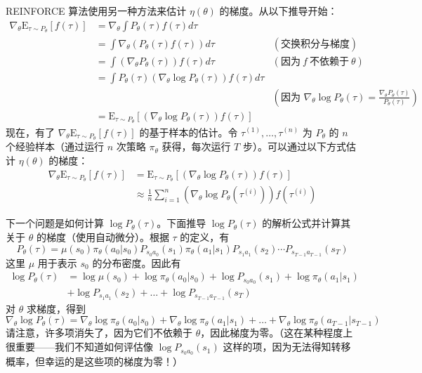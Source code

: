 REINFORCE 算法使用另一种方法来估计 $\eta(\theta)$ 的梯度。从以下推导开始：
\begin{align}
    \nabla_\theta \mathrm{E}_{\tau \sim P_\theta} [f(\tau)] &= \nabla_\theta \int P_\theta(\tau) f(\tau) d\tau &\nonumber \\
    &= \int \nabla_\theta (P_\theta(\tau) f(\tau)) d\tau &(\text{交换积分与梯度})& \nonumber \\
    &= \int (\nabla_\theta P_\theta(\tau)) f(\tau) d\tau &(\text{因为}\ f \ \text{不依赖于}\ \theta) &\nonumber \\
    &= \int P_\theta(\tau) (\nabla_\theta \log P_\theta(\tau)) f(\tau) d\tau \nonumber \\
    && (\text{因为 } \nabla_\theta \log P_\theta(\tau) = \frac{\nabla_\theta P_\theta(\tau)}{P_\theta(\tau)}) &\nonumber \\
    &= \mathrm{E}_{\tau \sim P_\theta} [(\nabla_\theta \log P_\theta(\tau)) f(\tau)] \label{eq:17.3}
\end{align}
现在，有了 $\nabla_\theta \mathrm{E}_{\tau \sim P_\theta} [f(\tau)]$ 的基于样本的估计。令 $\tau^{(1)}, \dots, \tau^{(n)}$ 为 $P_\theta$ 的 $n$ 个经验样本（通过运行 $n$ 次策略 $\pi_\theta$ 获得，每次运行 $T$ 步）。可以通过以下方式估计 $\eta(\theta)$ 的梯度：
\begin{align}
    \nabla_\theta \mathrm{E}_{\tau \sim P_\theta} [f(\tau)] &= \mathrm{E}_{\tau \sim P_\theta} [(\nabla_\theta \log P_\theta(\tau)) f(\tau)] \label{eq:17.4} \\
    &\approx \frac{1}{n} \sum_{i=1}^n (\nabla_\theta \log P_\theta(\tau^{(i)})) f(\tau^{(i)}) \label{eq:17.5}
\end{align}

下一个问题是如何计算 $\log P_\theta(\tau)$。下面推导 $\log P_\theta(\tau)$ 的解析公式并计算其关于 $\theta$ 的梯度（使用自动微分）。根据 $\tau$ 的定义，有
\begin{equation} \label{eq:17.6}
    P_\theta(\tau) = \mu(s_0)\pi_\theta(a_0|s_0)P_{s_0a_0}(s_1)\pi_\theta(a_1|s_1)P_{s_1a_1}(s_2)\cdots P_{s_{T-1}a_{T-1}}(s_T)
\end{equation}
这里 $\mu$ 用于表示 $s_0$ 的分布密度。因此有
\begin{align} 
    \log P_\theta(\tau) &= \log \mu(s_0) + \log \pi_\theta(a_0|s_0) + \log P_{s_0a_0}(s_1) + \log \pi_\theta(a_1|s_1) \nonumber\\
    &+ \log P_{s_1a_1}(s_2) + \dots + \log P_{s_{T-1}a_{T-1}}(s_T) \label{eq:17.7}
\end{align}
对 $\theta$ 求梯度，得到
\[
    \nabla_\theta \log P_\theta(\tau) = \nabla_\theta \log \pi_\theta(a_0|s_0) + \nabla_\theta \log \pi_\theta(a_1|s_1) + \dots + \nabla_\theta \log \pi_\theta(a_{T-1}|s_{T-1})
\]
请注意，许多项消失了，因为它们不依赖于 $\theta$，因此梯度为零。（这在某种程度上很重要——我们不知道如何评估像 $\log P_{s_0a_0}(s_1)$ 这样的项，因为无法得知转移概率，但幸运的是这些项的梯度为零！）

